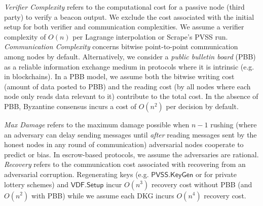 \documentclass[conference]{IEEEtran}
\theoremstyle{definition}
\theoremstyle{remark}
\begin{document}
\textit{Verifier Complexity} refers to the computational cost for a passive node (third party) to verify a beacon output. We exclude the cost associated with the initial setup for both verifier and communication complexities. We assume a verifier complexity of $O(n)$ per Lagrange interpolation or Scrape's PVSS \cite{cascudo2017scrape} run. \textit{Communication Complexity} concerns bitwise point-to-point communication among nodes by default. Alternatively, we consider a \textit{public bulletin board} (PBB) as a reliable information exchange medium in protocols where it is intrinsic (e.g. in blockchains). In a PBB model, we assume both the bitwise writing cost (amount of data posted to PBB) and the reading cost (by all nodes where each node only reads data relevant to it) contribute to the total cost. In the absence of PBB, Byzantine consensus \cite{castro1999practical} incurs a cost of $O(n^2)$ per decision by default.

\textit{Max Damage} refers to the maximum damage possible when $n - 1$ rushing \cite{gennaro1999secure} (where an adversary can delay sending messages until \textit{after} reading messages sent by the honest nodes in any round of communication) adversarial nodes cooperate to predict or bias. In escrow-based protocols, we assume the adversaries are rational. \textit{Recovery} refers to the communication cost associated with recovering from an adversarial corruption. Regenerating keys (e.g. $\mathsf{PVSS.KeyGen}$ or for private lottery schemes) and $\mathsf{VDF.Setup}$ incur $O(n^3)$ recovery cost without PBB (and $O(n^2)$ with PBB) while we assume each DKG incurs $O(n^4)$ recovery cost.
\end{document}
